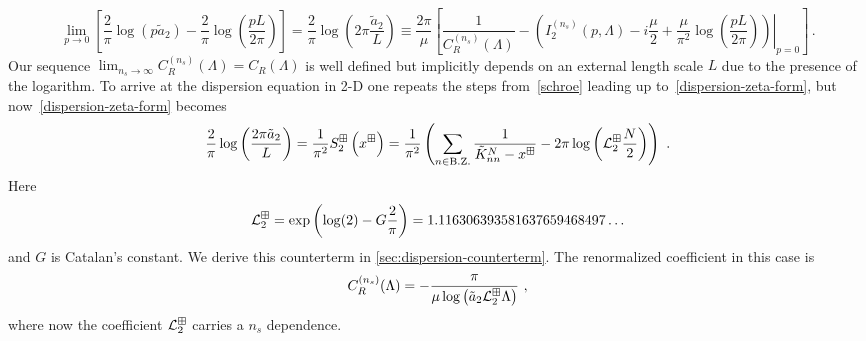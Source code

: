 \begin{equation}
	\lim\limits_{p\to 0}
	\left[
		\frac { 2 } { \pi } \log \left( p \tilde a _ { 2 } \right)-\frac{2}{\pi } \log \left(\frac{pL}{2\pi}\right)
	\right]
	=
	\frac { 2 } { \pi } \log \left(2\pi \frac{\tilde a _ { 2 }}{L} \right)
	\equiv
	\frac{2 \pi}{\mu}
		\left[
		\frac{1}{C_R^{(n_s)}(\Lambda)} - \left.\left(I_2^{(n_s)}(p, \Lambda) - i\frac{\mu}{2}+\frac{\mu}{\pi^2} \log \left(\frac{pL}{2\pi}\right)\right)\right|_{p=0}
		\right]
	\, .
\end{equation}
Our sequence $\lim_{n_s\to\infty}C^{(n_s)}_R(\Lambda) = C_R(\Lambda)$ is well defined but implicitly depends on an external length scale $L$ due to the presence of the logarithm.  To arrive at the dispersion equation in 2-D one repeats the steps from~\eqref{schroe} leading up to~\eqref{dispersion-zeta-form}, but now~\eqref{dispersion-zeta-form} becomes
\begin{equation}
    \frac{2}{\pi} \log \left(\frac{2\pi \tilde a_{2}}{L}\right)=\frac{1}{\pi^2}S^{\boxplus}_2\left(x^\boxplus\right)
    =
    \frac{1}{\pi^2}
    \left(
        \sum_{n\in\operatorname{B.Z.}}\frac{1}{\tilde{K}^N_{nn}-x^\boxplus}
        -2\pi \log \left(\mathcal{L}^\boxplus_2\frac{N}{2}\right)
    \right)\ .
\end{equation}
Here
\begin{equation}
    \mathcal{L}^\boxplus_{2}
    =
    \exp \left(\log (2)-G \frac{2}{\pi}\right)
    =
    1.116306393581637659468497 \ldots
\end{equation}
and $G$ is Catalan's constant.  We derive this counterterm in \ref{sec:dispersion-counterterm}.  The renormalized coefficient in this case is
\begin{equation}\label{eq:C2-dispersion}
C^{(n_s)}_R(\Lambda)=-\frac{ \pi}{\mu \log \left(\tilde a_{2} \mathcal{L}^\boxplus_2\Lambda\right)}\ ,
\end{equation}
where now the coefficient $\mathcal{L}_2^\boxplus$ carries a $n_s$ dependence.
